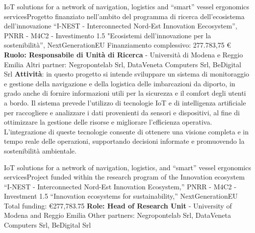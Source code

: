 




\shorterCventry

{IoT solutions for a network of navigation, logistics and “smart” vessel ergonomics services}{\newline Progetto finanziato nell’ambito del programma di ricerca dell’ecosistema dell’innovazione “I-NEST - Interconnected Nord-Est Innovation Eecosystem”, PNRR - M4C2 - Investimento 1.5 "Ecosistemi dell’innovazione per la sostenibilità”, NextGenerationEU}
{\newline
	Finanziamento complessivo: 277.783,75 €\newline
	\textbf{Ruolo: Responsabile di Unità di Ricerca} - Università di Modena e Reggio Emilia\newline
	Altri partner: Negropontelab Srl, DataVeneta Computers Srl, BeDigital Srl}{
        \textbf{Attività}: in questo progetto si intende sviluppare un sistema di monitoraggio e gestione della navigazione e della logistica
    delle imbarcazioni da diporto, in grado anche di fornire informazioni utili per la sicurezza e il comfort degli utenti a bordo. Il sistema
    prevede l’utilizzo di tecnologie IoT e di intelligenza artificiale per raccogliere e analizzare i dati provenienti da sensori e dispositivi, al fine di ottimizzare la gestione delle risorse e migliorare l'efficienza operativa. L'integrazione di queste tecnologie consente di ottenere una visione completa e in tempo reale delle operazioni, supportando decisioni informate e promuovendo la sostenibilità ambientale.}

{IoT solutions for a network of navigation, logistics, and “smart” vessel ergonomics services}{\newline Project funded within the research program of the Innovation ecosystem “I-NEST - Interconnected Nord-Est Innovation Ecosystem,” PNRR - M4C2 - Investment 1.5 “Innovation ecosystems for sustainability,” NextGenerationEU}
{\newline
    Total funding: €277,783.75\newline
    \textbf{Role: Head of Research Unit} - University of Modena and Reggio Emilia\newline
    Other partners: Negropontelab Srl, DataVeneta Computers Srl, BeDigital Srl}{}

